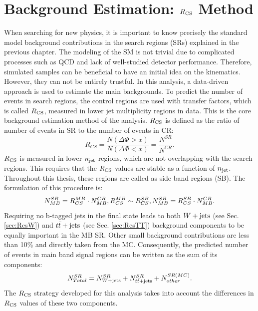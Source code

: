 \chapter{Background Estimation: $R_{\rm CS}$ Method}
\label{chap:Rcs}
\minitoc
When searching for new physics, it is important to know precisely the standard model background contributions in the search regions (SRs) explained in the previous chapter. The modeling of the SM is not trivial due to complicated processes such as QCD and lack of well-studied detector performance.
Therefore, simulated samples can be beneficial to have an initial idea on the kinematics. However, they can not be entirely trustful. In this analysis, a data-driven approach is used to estimate the main backgrounds.
To predict the number of events in search regions, the control regions are used with transfer factors, which is called $R_{\rm CS}$, measured in lower jet multiplicity regions in data. This is the core background estimation method of the analysis. 
$R_{\rm CS}$ is defined as the ratio of number of events in SR to the number of events in CR:\\
\begin{equation}
\label{eq:rcs}
R_{CS} = \frac{N(\Delta\Phi>x)}{N(\Delta\Phi<x)} = \frac{N^{SR}}{N^{CR}}.
\end{equation}
$R_{\rm CS}$ is measured in lower $n_{\rm jet}$ regions, which are not overlapping with the search regions. This requires that the $R_{\rm CS}$ values are stable as a function of $n_{\rm jet}$. 
Throughout this thesis, these regions are called as side band regions (SB). The formulation of this procedure is:
\begin{equation}
\label{eq:RcsProc}
{N_{MB}^{SR}} = {R_{CS}^{MB} \cdot N_{MB}^{CR}},\\
{R_{CS}^{MB} \sim R_{CS}^{SB}},\\
{N_{MB}^{SR}} = {R_{CS}^{SB} \cdot N_{MB}^{CR}}.\\
\end{equation}
Requiring no b-tagged jets in the final state leads to both $W+\textrm{jets}$ (see Sec. \ref{sec:RcsW}) and $t\bar{t}+\textrm{jets}$ (see Sec. \ref{sec:RcsTT}) background components to be equally important in the MB SR.  Other small background contributions are less than 10\% and directly taken from the MC. 
Consequently, the predicted number of events in main band signal regions can be written as the sum of its components:
\begin{equation}
\label{eq:rcss}
N_{Total}^{SR} = N_{W+\textrm{jets}}^{SR}+N_{t\bar{t}+\textrm{jets}}^{SR}+N_{other}^{SR(MC)}.
\end{equation}
The $R_{\rm CS}$ strategy developed for this analysis takes into account the differences in $R_{\rm CS}$ values of these two components.
